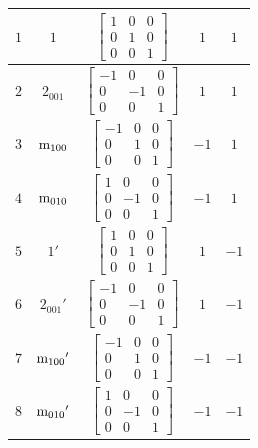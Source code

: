 \documentclass[fleqn,8pt]{jsarticle}
\begin{document}
\begin{longtable}{ccccc}
$ 1 $ & $ 1 $ & $ \begin{bmatrix} 1 & 0 & 0 \\ 0 & 1 & 0 \\ 0 & 0 & 1 \end{bmatrix} $ & $ 1 $ & $ 1 $ \\ \hline
$ 2 $ & $ 2{}_{001} $ & $ \begin{bmatrix} -1 & 0 & 0 \\ 0 & -1 & 0 \\ 0 & 0 & 1 \end{bmatrix} $ & $ 1 $ & $ 1 $ \\ \hline
$ 3 $ & $ {\rm m}_{100} $ & $ \begin{bmatrix} -1 & 0 & 0 \\ 0 & 1 & 0 \\ 0 & 0 & 1 \end{bmatrix} $ & $ -1 $ & $ 1 $ \\ \hline
$ 4 $ & $ {\rm m}_{010} $ & $ \begin{bmatrix} 1 & 0 & 0 \\ 0 & -1 & 0 \\ 0 & 0 & 1 \end{bmatrix} $ & $ -1 $ & $ 1 $ \\ \hline
$ 5 $ & $ 1{}' $ & $ \begin{bmatrix} 1 & 0 & 0 \\ 0 & 1 & 0 \\ 0 & 0 & 1 \end{bmatrix} $ & $ 1 $ & $ -1 $ \\ \hline
$ 6 $ & $ 2{}_{001}{}' $ & $ \begin{bmatrix} -1 & 0 & 0 \\ 0 & -1 & 0 \\ 0 & 0 & 1 \end{bmatrix} $ & $ 1 $ & $ -1 $ \\ \hline
$ 7 $ & $ {\rm m}_{100}{}' $ & $ \begin{bmatrix} -1 & 0 & 0 \\ 0 & 1 & 0 \\ 0 & 0 & 1 \end{bmatrix} $ & $ -1 $ & $ -1 $ \\ \hline
$ 8 $ & $ {\rm m}_{010}{}' $ & $ \begin{bmatrix} 1 & 0 & 0 \\ 0 & -1 & 0 \\ 0 & 0 & 1 \end{bmatrix} $ & $ -1 $ & $ -1 $ \\
\end{longtable}
\end{document}
